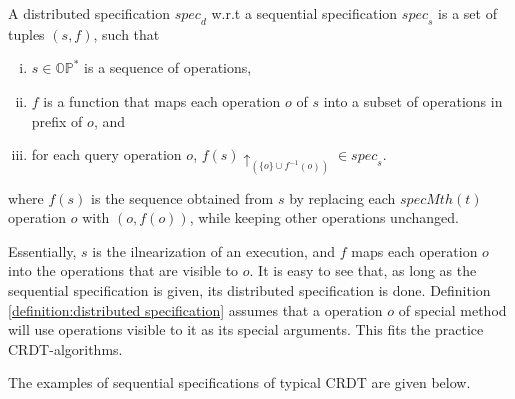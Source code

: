 
\begin{definition}
\label{definition:distributed specification}
A distributed specification $\mathit{spec}_d$ w.r.t a sequential specification $\mathit{spec}_s$ is a set of tuples $(s,f)$, such that

\begin{enumerate}[(i)]
\item $s \in \mathbb{OP}^*$ is a sequence of operations,
\item $f$ is a function that maps each operation $o$ of $s$ into a subset of operations in prefix of $o$, and
\item for each query operation $o$, $f(s) \uparrow_{ ( \{ o \} \cup f^{-1}(o))} \in \mathit{spec}_s$.
\end{enumerate}

where $f(s)$ is the sequence obtained from $s$ by replacing each $\mathit{specMth}(t)$ operation $o$ with $(o,f(o))$, while keeping other operations unchanged. 
\end{definition}

Essentially, $s$ is the ilnearization of an execution, and $f$ maps each operation $o$ into the operations that are visible to $o$. It is easy to see that, as long as the sequential specification is given, its distributed specification is done. Definition \ref{definition:distributed specification} assumes that a operation $o$ of special method will use operations visible to it as its special arguments. This fits the practice CRDT-algorithms. 

The examples of sequential specifications of typical CRDT are given below.

